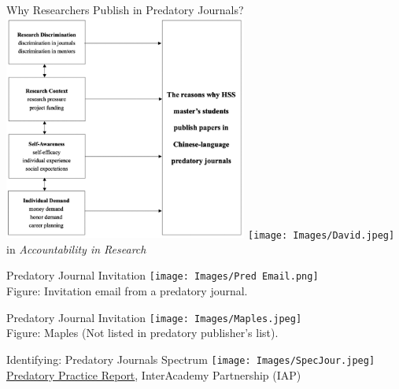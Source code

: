 \documentclass[11pt]{beamer}
\begin{document}
\begin{frame}{Why Researchers Publish in Predatory Journals?}
\includegraphics[width=0.6\textwidth]{WhyPred.png}%
\texttt{[image: Images/David.jpeg]}
 in \textit{Accountability in Research}
\end{frame}

\begin{frame}{Predatory Journal Invitation}
	\centering\texttt{[image: Images/Pred Email.png]} \\
 Figure: Invitation email from a predatory journal.
\end{frame}

\begin{frame}{Predatory Journal Invitation}
	\centering\texttt{[image: Images/Maples.jpeg]} \\
 Figure: Maples (Not listed in predatory publisher's list).
\end{frame}

\begin{frame}{Identifying: Predatory Journals Spectrum}
	\centering \texttt{[image: Images/SpecJour.jpeg]} \\
 {\color{blue}\href{https://www.interacademies.org/publication/predatory-practices-report-English}{Predatory Practice Report}}, InterAcademy Partnership (IAP)
\end{frame}

\end{document}
